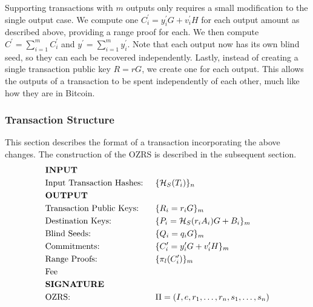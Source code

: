 \documentclass{article}
\newcommand{\sidx}{\ensuremath{*}}
\newcommand{\sx}{\ensuremath{x_\sidx}}
\newcommand{\oy}{\ensuremath{y^\prime}}
\newcommand{\oiy}{\ensuremath{y^\prime_i}}
\newcommand{\oC}{\ensuremath{C^\prime}}
\newcommand{\oiC}{\ensuremath{C^\prime_i}}
\newcommand{\oiv}{\ensuremath{v^\prime_i}}
\newcommand{\hs}{\ensuremath{\mathcal{H}_S}}
\newcommand{\hp}{\ensuremath{\mathcal{H}_P}}
\begin{document}
Supporting transactions with $m$ outputs only requires a small modification to
the single output case.  We compute one $\oiC = \oiy G + \oiv H$ for each output
amount as described above, providing a range proof for each.  We then compute
$\oC = \sum_{i=1}^m \oiC$ and $\oy = \sum_{i=1}^m \oiy$.  Note that each output
now has its own blind seed, so they can each be recovered independently.
Lastly, instead of creating a single transaction public key $R=rG$, we create
one for each output.  This allows the outputs of a transaction to be spent
independently of each other, much like how they are in Bitcoin.

\subsubsection{Transaction Structure}

This section describes the format of a transaction incorporating the above
changes.  The construction of the OZRS is described in the subsequent section.
\begin{align*} 
  & \text{\bf{INPUT}}       &&                                           \\%
  & \text{Input Transaction Hashes: } && \{ \hs(T_i) \}_n                 \\%
  & \text{\bf{OUTPUT}}     &&                                            \\%
  & \text{Transaction Public Keys: } && \{ R_i = r_i G \}_m               \\%
  & \text{Destination Keys: } && \{ P_i = \hs(r_i A_i)G + B_i \}_m        \\%
  & \text{Blind Seeds: } && \{ Q_i = q_i G \}_m                           \\%
  & \text{Commitments: } && \{ \oiC = \oiy G + \oiv H \}_m                \\%
  & \text{Range Proofs: } && \{ \pi_l(\oiC) \}_m                          \\%
  & \text{Fee } &&                                                       \\%
  & \text{\bf{SIGNATURE}} &&                                              \\%
  & \text{OZRS: } && \Pi = (I, e, r_1, \dots, r_n, s_1, \dots, s_n)       \\%
\end{align*} 
\end{document}
